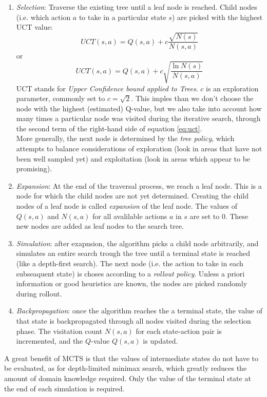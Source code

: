 \documentclass[a4paper,10pt]{article}
\begin{document}
\begin{enumerate}
    \item \emph{Selection}: Traverse the existing tree until a leaf node is reached. Child nodes (i.e. which action $a$ to take in a particular state $s$) are picked with the highest UCT value:
    \begin{equation}
        UCT(s, a) = Q(s, a) + c \frac{\sqrt{N(s)}}{N(s, a)}
        \label{eq:uct}
    \end{equation}
    or
    \begin{equation}
        UCT(s, a) = Q(s, a) + c \sqrt{\frac{\ln{N(s)}}{N(s, a)}}
        \label{eq:uct2}
    \end{equation}
    UCT stands for \emph{Upper Confidence bound applied to Trees}. $c$ is an exploration parameter, commonly set to $c = \sqrt{2}$. This imples than we don't choose the node with the highest (estimated) Q-value, but we also take into account how many times a particular node was visited during the iterative search, through the second term of the right-hand side of equation \ref{eq:uct}.\\
    More generally, the next node is determined by the \emph{tree policy}, which attempts to balance considerations of exploration (look in areas that have not been well sampled yet) and exploitation (look in areas which appear to be promising).
    \item \emph{Expansion}: At the end of the traversal process, we reach a leaf node. This is a node for which the child nodes are not yet determined. Creating the child nodes of a leaf node is called \emph{expansion} of the leaf node. The values of $Q(s, a)$ and $N(s, a)$ for all avalilable actions $a$ in $s$ are set to $0$. These new nodes are added as leaf nodes to the search tree.
    \item \emph{Simulation}: after exapnsion, the algorithm picks a child node arbitrarily, and simulates an entire search trough the tree until a terminal state is reached (like a depth-first search). The next node (i.e. the action to take in each subseaquent state) is choses according to a \emph{rollout policy}. Unless a priori information or good heuristics are known, the nodes are picked randomly during rollout. 
    \item \emph{Backpropagation}: once the algorithm reaches the a terminal state, the value of that state is backpropagated through all nodes visited during the selection phase. The visitation count $N(s, a)$ for each state-action pair is incremented, and the $Q$-value $Q(s, a)$ is updated.
\end{enumerate}
A great benefit of MCTS is that the values of intermediate states do not have to be evaluated, as for depth-limited minimax search, which greatly reduces the amount of domain knowledge required. Only the value of the terminal state at the end of each simulation is required.
\end{document}

